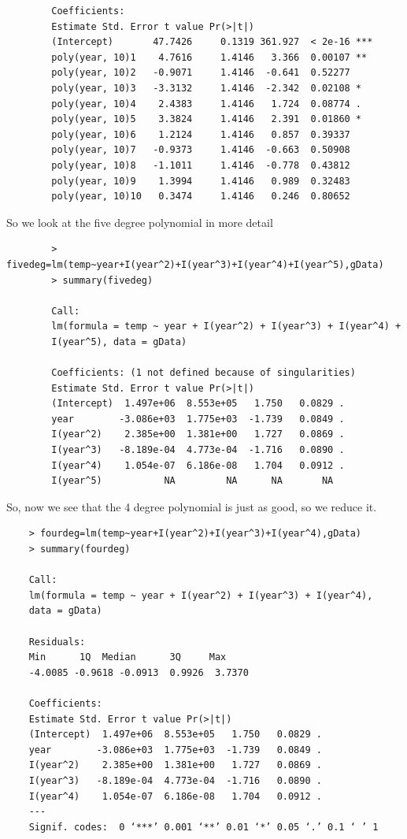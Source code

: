 \documentclass[11pt]{article}
\begin{document}
\begin{enumerate}
\begin{enumerate}
\begin{verbatim}
		Coefficients:
		Estimate Std. Error t value Pr(>|t|)    
		(Intercept)       47.7426     0.1319 361.927  < 2e-16 ***
		poly(year, 10)1    4.7616     1.4146   3.366  0.00107 ** 
		poly(year, 10)2   -0.9071     1.4146  -0.641  0.52277    
		poly(year, 10)3   -3.3132     1.4146  -2.342  0.02108 *  
		poly(year, 10)4    2.4383     1.4146   1.724  0.08774 .  
		poly(year, 10)5    3.3824     1.4146   2.391  0.01860 *  
		poly(year, 10)6    1.2124     1.4146   0.857  0.39337    
		poly(year, 10)7   -0.9373     1.4146  -0.663  0.50908    
		poly(year, 10)8   -1.1011     1.4146  -0.778  0.43812    
		poly(year, 10)9    1.3994     1.4146   0.989  0.32483    
		poly(year, 10)10   0.3474     1.4146   0.246  0.80652    
	\end{verbatim}
	So we look at the five degree polynomial in more detail 
	\begin{verbatim}
		> fivedeg=lm(temp~year+I(year^2)+I(year^3)+I(year^4)+I(year^5),gData)
		> summary(fivedeg)
		
		Call:
		lm(formula = temp ~ year + I(year^2) + I(year^3) + I(year^4) + 
		I(year^5), data = gData)

		Coefficients: (1 not defined because of singularities)
		Estimate Std. Error t value Pr(>|t|)  
		(Intercept)  1.497e+06  8.553e+05   1.750   0.0829 .
		year        -3.086e+03  1.775e+03  -1.739   0.0849 .
		I(year^2)    2.385e+00  1.381e+00   1.727   0.0869 .
		I(year^3)   -8.189e-04  4.773e-04  -1.716   0.0890 .
		I(year^4)    1.054e-07  6.186e-08   1.704   0.0912 .
		I(year^5)           NA         NA      NA       NA  
	\end{verbatim}
	So, now we see that the 4 degree polynomial is just as good, so we reduce it.
	\begin{verbatim}
	> fourdeg=lm(temp~year+I(year^2)+I(year^3)+I(year^4),gData)
	> summary(fourdeg)
	
	Call:
	lm(formula = temp ~ year + I(year^2) + I(year^3) + I(year^4), 
	data = gData)
	
	Residuals:
	Min      1Q  Median      3Q     Max 
	-4.0085 -0.9618 -0.0913  0.9926  3.7370 
	
	Coefficients:
	Estimate Std. Error t value Pr(>|t|)  
	(Intercept)  1.497e+06  8.553e+05   1.750   0.0829 .
	year        -3.086e+03  1.775e+03  -1.739   0.0849 .
	I(year^2)    2.385e+00  1.381e+00   1.727   0.0869 .
	I(year^3)   -8.189e-04  4.773e-04  -1.716   0.0890 .
	I(year^4)    1.054e-07  6.186e-08   1.704   0.0912 .
	---
	Signif. codes:  0 ‘***’ 0.001 ‘**’ 0.01 ‘*’ 0.05 ‘.’ 0.1 ‘ ’ 1
	

\end{verbatim}
\end{enumerate}
\end{enumerate}
\end{document}
